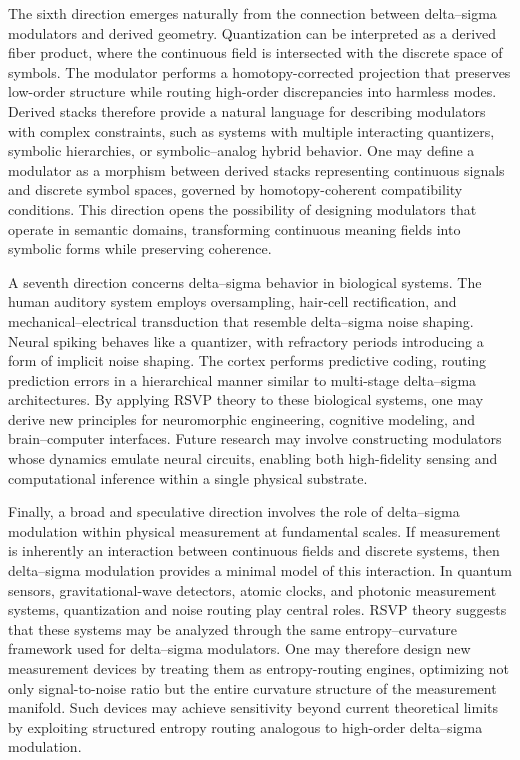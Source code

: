 The sixth direction emerges naturally from the connection between delta–sigma modulators and derived geometry. Quantization can be interpreted as a derived fiber product, where the continuous field is intersected with the discrete space of symbols. The modulator performs a homotopy-corrected projection that preserves low-order structure while routing high-order discrepancies into harmless modes. Derived stacks therefore provide a natural language for describing modulators with complex constraints, such as systems with multiple interacting quantizers, symbolic hierarchies, or symbolic–analog hybrid behavior. One may define a modulator as a morphism between derived stacks representing continuous signals and discrete symbol spaces, governed by homotopy-coherent compatibility conditions. This direction opens the possibility of designing modulators that operate in semantic domains, transforming continuous meaning fields into symbolic forms while preserving coherence.

A seventh direction concerns delta–sigma behavior in biological systems. The human auditory system employs oversampling, hair-cell rectification, and mechanical–electrical transduction that resemble delta–sigma noise shaping. Neural spiking behaves like a quantizer, with refractory periods introducing a form of implicit noise shaping. The cortex performs predictive coding, routing prediction errors in a hierarchical manner similar to multi-stage delta–sigma architectures. By applying RSVP theory to these biological systems, one may derive new principles for neuromorphic engineering, cognitive modeling, and brain–computer interfaces. Future research may involve constructing modulators whose dynamics emulate neural circuits, enabling both high-fidelity sensing and computational inference within a single physical substrate.

Finally, a broad and speculative direction involves the role of delta–sigma modulation within physical measurement at fundamental scales. If measurement is inherently an interaction between continuous fields and discrete systems, then delta–sigma modulation provides a minimal model of this interaction. In quantum sensors, gravitational-wave detectors, atomic clocks, and photonic measurement systems, quantization and noise routing play central roles. RSVP theory suggests that these systems may be analyzed through the same entropy–curvature framework used for delta–sigma modulators. One may therefore design new measurement devices by treating them as entropy-routing engines, optimizing not only signal-to-noise ratio but the entire curvature structure of the measurement manifold. Such devices may achieve sensitivity beyond current theoretical limits by exploiting structured entropy routing analogous to high-order delta–sigma modulation.

